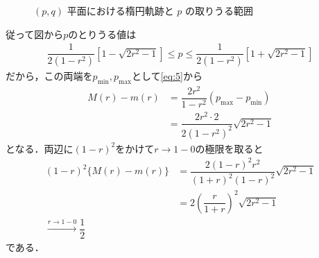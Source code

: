 \documentclass[../../main.tex]{subfiles}
\begin{document}
\begin{figure}[htb]
  \caption{$(p, q)$ 平面における楕円軌跡と $p$ の取りうる範囲}
  \label{fig:pq_ellipse_trajectory}
\end{figure}

従って図から$p$のとりうる値は
\begin{align}
  \dfrac{1}{2(1-r^2)} \left[ 1 - \sqrt{2r^2-1} \right] \le p \le
  \dfrac{1}{2(1-r^2)} \left[ 1 + \sqrt{2r^2-1} \right]
\end{align}
だから，この両端を$p_{\min},p_{\max}$として\cref{eq:5}から
\begin{align}
  M(r) - m(r)
  &= \dfrac{2r^2}{1-r^2}(p_{\max}-p_{\min}) \\
  &= \dfrac{2r^2 \cdot 2}{2(1-r^2)^2} \sqrt{2r^2-1}
\end{align}
となる．両辺に$(1-r)^2$をかけて$r\to 1-0$の極限を取ると
\begin{align}
  (1-r)^2 \{ M(r) - m(r) \}
  &= \dfrac{2(1-r)^2 r^2}{(1+r)^2(1-r)^2} \sqrt{2r^2-1} \\
  &= 2 \left(\dfrac{r}{1+r}\right)^2 \sqrt{2r^2-1} \\
  \xrightarrow{r\to 1-0} \dfrac{1}{2}
\end{align}
である．

\newpage
\end{document}
